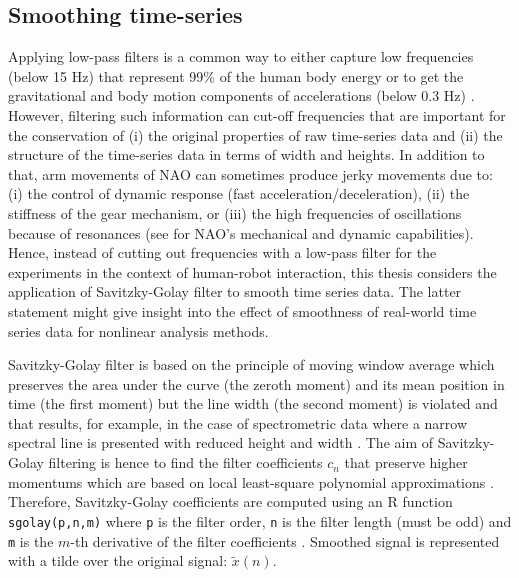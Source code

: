 \subsection{Smoothing time-series}
Applying low-pass filters is a common way to either capture low 
frequencies (below 15 Hz) that represent 99\% of the human body 
energy or to get the gravitational and body motion components of 
accelerations (below 0.3 Hz) \citep{anguita2013}.
However, filtering such information can cut-off frequencies that 
are important for the conservation of  
(i) the original properties of raw time-series data and 
(ii) the structure of the time-series data in terms of width and heights.
In addition to that, arm movements of NAO can sometimes produce 
jerky movements due to: 
(i) the control of dynamic response (fast acceleration/deceleration), 
(ii) the stiffness of the gear mechanism, or 
(iii) the high frequencies of oscillations because of resonances
(see \cite{gouaillier2009} for NAO's mechanical and dynamic 
capabilities). 
Hence, instead of cutting out frequencies with a low-pass filter
for the experiments in the context of human-robot interaction, 
this thesis considers the application of Savitzky-Golay filter 
to smooth time series data.
The latter statement might give insight into the effect 
of smoothness of real-world time series data for 
nonlinear analysis methods.

Savitzky-Golay filter is based on the principle of moving 
window average which preserves the area under the curve (the zeroth moment)
and its mean position in time (the first moment) but the line width 
(the second moment) is violated and that results, for example, in the case 
of spectrometric data where a narrow spectral line is presented with 
reduced height and width \citep{press1992}.
The aim of Savitzky-Golay filtering is hence to find the filter coefficients 
$c_n$ that preserve higher momentums which are based on local least-square 
polynomial approximations 
\citep{savitzkygolay1964, press1992, schafer2011}.
Therefore, Savitzky-Golay coefficients are computed using an R function 
\texttt{sgolay(p,n,m)} where \texttt{p} is the filter order, 
\texttt{n} is the filter length (must be odd) 
and \texttt{m} is the $m$-th derivative of the filter coefficients 
\citep{Rsignal}. Smoothed signal is represented with a tilde over the 
original signal: $\tilde{x}(n)$.

